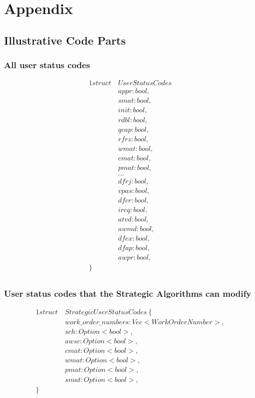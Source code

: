 \newpage
\section{Appendix}
\subsection{Illustrative Code Parts}\label{sec:separating-concerns}

\subsubsection{All user status codes}
\begin{alignat*}{1}
struct\ & UserStatusCodes \\
    & appr: bool, \\
    & smat: bool, \\
    & init: bool, \\
    & rdbl: bool, \\
    & qcap: bool, \\
    & rfrz: bool, \\
    & wmat: bool, \\
    & cmat: bool, \\
    & pmat: bool, \\
    & ... \\
    & dfrj: bool, \\
    & vpas: bool, \\
    & dfcr: bool, \\
    & ireq: bool, \\
    & atvd: bool, \\
    & awmd: bool, \\
    & dfex: bool, \\
    & dfap: bool, \\
    & awpr: bool, \\
\} \ \ &\\
\end{alignat*}

\subsubsection{User status codes that the Strategic Algorithms can modify}
\begin{alignat*}{1}
struct\ & StrategicUserStatusCodes \ \{ \\
    & work\_order\_numbers: Vec<WorkOrderNumber>,\\
    & sch: Option<bool>,\\
    & awsc: Option<bool>,\\
    & cmat: Option<bool>,\\
    & wmat: Option<bool>,\\
    & pmat: Option<bool>,\\
    & smat: Option<bool>,\\
\}\ \ &\\
\end{alignat*}

